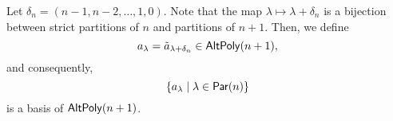 Let \(\delta_n = (n-1, n-2, \ldots, 1, 0)\).
Note that the map \(\lambda \mapsto \lambda + \delta_n\) is a bijection between strict partitions of \(n\) and partitions of \(n+1\).
Then, we define
\begin{equation}
    a_\lambda = \tilde{a}_{\lambda + \delta_n} \in \operatorname{\mathsf{AltPoly}}(n+1),
\end{equation}
and consequently, 
\begin{equation}
    \{ a_\lambda \mid \lambda \in \operatorname{\mathsf{Par}}(n) \}
\end{equation}
is a basis of \(\operatorname{\mathsf{AltPoly}}(n+1)\).

